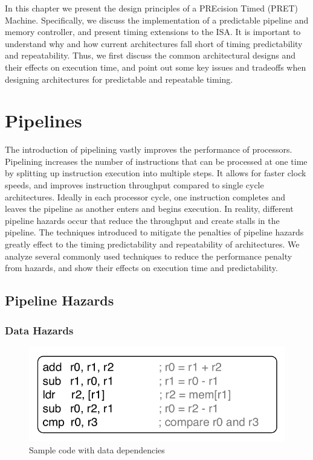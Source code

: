 In this chapter we present the design principles of a PREcision Timed (PRET) Machine.
Specifically, we discuss the implementation of a predictable pipeline and memory controller, and present timing extensions to the ISA. 
It is important to understand why and how current architectures fall short of timing predictability and repeatability.
Thus, we first discuss the common architectural designs and their effects on execution time, and point out some key issues and tradeoffs when designing architectures for predictable and repeatable timing.

\section{Pipelines}
The introduction of pipelining vastly improves the performance of processors.
Pipelining increases the number of instructions that can be processed at one time by splitting up instruction execution into multiple steps.
It allows for faster clock speeds, and improves instruction throughput compared to single cycle architectures.
Ideally in each processor cycle, one instruction completes and leaves the pipeline as another enters and begins execution. 
In reality, different pipeline hazards occur that reduce the throughput and create stalls in the pipeline.
The techniques introduced to mitigate the penalties of pipeline hazards greatly effect to the timing predictability and repeatability of architectures.     
We analyze several commonly used techniques to reduce the performance penalty from hazards, and show their effects on execution time and predictability. 

\subsection{Pipeline Hazards}
\label{sec:pipeline_hazards}
\subsubsection{Data Hazards}

\begin{figure}
  \vspace{-30pt}
  \begin{center}
    \includegraphics[scale=.65]{figs/sample_data_dependent_code}
  \end{center}
  \vspace{-3mm}
  \caption{Sample code with data dependencies}
  \label{fig:sample_data_dependent_code}
\end{figure}

